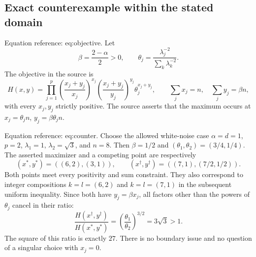 \documentclass[10pt]{article}
\begin{document}
\subsection*{Exact counterexample within the stated domain}
Equation reference: eq:objective. Let \[\beta=\frac{2-\alpha}{2}>0,\qquad
 \theta_j=\frac{\lambda_j^{-2}}{\sum_k\lambda_k^{-2}}.\] The objective in the source is \[
 H(x,y)=\prod_{j=1}^p
 \left(\frac{x_j+y_j}{x_j}\right)^{x_j}
 \left(\frac{x_j+y_j}{y_j}\right)^{y_j}
 \theta_j^{x_j+y_j},
 \qquad \sum_jx_j=n,\quad\sum_jy_j=\beta n,\] with every \(x_j,y_j\) strictly positive. The source asserts that the maximum occurs at \(x_j=\theta_jn\), \(y_j=\beta\theta_jn\).\par
Equation reference: eq:counter. Choose the allowed white-noise case \(\alpha=d=1\), \(p=2\), \(\lambda_1=1\), \(\lambda_2=\sqrt3\), and \(n=8\). Then \(\beta=1/2\) and \((\theta_1,\theta_2)=(3/4,1/4)\). The asserted maximizer and a competing point are respectively \[(x^*,y^*)=((6,2),(3,1)),\qquad
 (x^\dagger,y^\dagger)=((7,1),(7/2,1/2)).\] Both points meet every positivity and sum constraint. They also correspond to integer compositions \(k=l=(6,2)\) and \(k=l=(7,1)\) in the subsequent uniform inequality. Since both have \(y_j=\beta x_j\), all factors other than the powers of \(\theta_j\) cancel in their ratio: \[
 \frac{H(x^\dagger,y^\dagger)}{H(x^*,y^*)}
 =\left(\frac{\theta_1}{\theta_2}\right)^{3/2}
 =3\sqrt3>1.\] The square of this ratio is exactly \(27\). There is no boundary issue and no question of a singular choice with \(x_j=0\).\par
\end{document}
